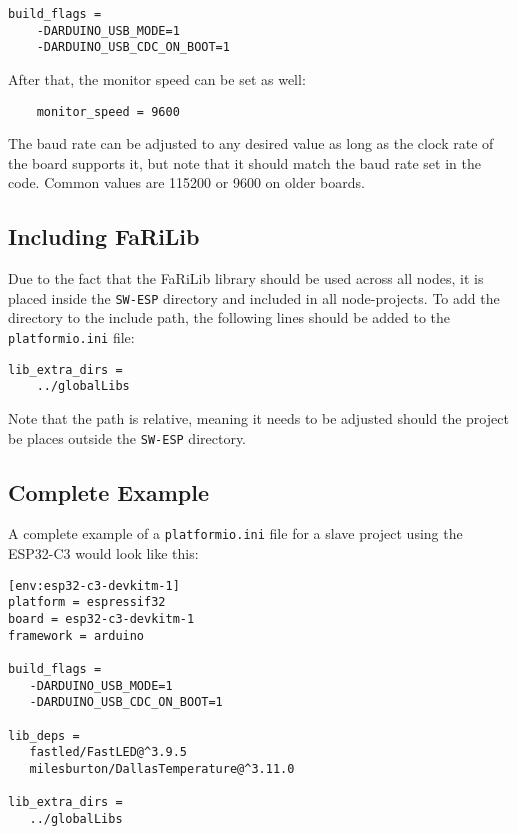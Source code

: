     \begin{verbatim}
build_flags =
    -DARDUINO_USB_MODE=1
    -DARDUINO_USB_CDC_ON_BOOT=1
    \end{verbatim}
    After that, the monitor speed can be set as well:
    \begin{verbatim}
    monitor_speed = 9600
    \end{verbatim}
    The baud rate can be adjusted to any desired value as long as the clock rate
    of the board supports it, but note that it should match the baud rate set in 
    the code. Common values are 115200 or 9600 on older boards.

    \subsection{Including FaRiLib} \label{sec:farilib_include}
    Due to the fact that the FaRiLib library should be used across all nodes, it is
    placed inside the \texttt{SW-ESP} directory and included in all node-projects.
    To add the directory to the include path, the following lines should be added to
    the \texttt{platformio.ini} file:
    \begin{verbatim}
lib_extra_dirs =
    ../globalLibs
    \end{verbatim}
    Note that the path is relative, meaning it needs to be adjusted should the project
    be places outside the \texttt{SW-ESP} directory.

    \subsection{Complete Example}
    A complete example of a \texttt{platformio.ini} file for a slave project
    using the ESP32-C3 would look like this:

    \begin{verbatim}
[env:esp32-c3-devkitm-1]
platform = espressif32
board = esp32-c3-devkitm-1
framework = arduino

build_flags =
   -DARDUINO_USB_MODE=1
   -DARDUINO_USB_CDC_ON_BOOT=1

lib_deps = 
   fastled/FastLED@^3.9.5
   milesburton/DallasTemperature@^3.11.0

lib_extra_dirs =
   ../globalLibs
   \end{verbatim}

